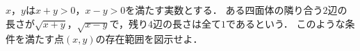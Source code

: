 \documentclass[../../main.tex]{subfiles}
\begin{document}
$x$，$y$は$x+y>0$，$x-y>0$を満たす実数とする．
ある四面体の隣り合う$2$辺の長さが$\sqrt{x+y}$，$\sqrt{x-y}$で，残り$4$辺の長さは全て$1$であるという．
このような条件を満たす点$(x,y)$の存在範囲を図示せよ．
\end{document}
